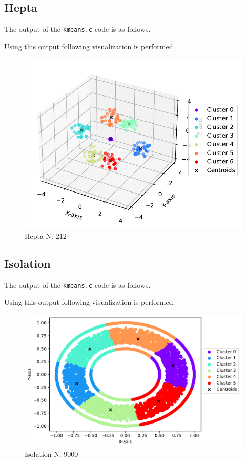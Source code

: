 \subsection{Hepta}
The output of the \texttt{kmeans.c} code is as follows.


Using this output following visualization is performed.
\begin{figure}[H]
    \centering
    \includegraphics[width=.8\textwidth]{figures/hepta.pdf}
    \caption{Hepta N: 212}
    \label{hepta}
\end{figure}

\subsection{Isolation}
The output of the \texttt{kmeans.c} code is as follows.


Using this output following visualization is performed.
\begin{figure}[H]
    \centering
    \includegraphics[width=.8\textwidth]{figures/isolation.pdf}
    \caption{Isolation N: 9000}
    \label{isolation}
\end{figure}

